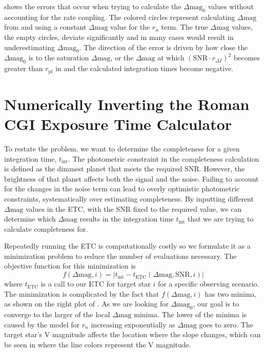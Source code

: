  shows the errors that occur when trying to
calculate the $\Delta\textrm{mag}_0$ values without accounting for the rate
coupling. The colored circles represent calculating $\Delta\textrm{mag}$
from  and using a constant
$\Delta\textrm{mag}$ value for the $r_n$ term. The true $\Delta\textrm{mag}$
values, the empty circles, deviate significantly and in many cases would result
in underestimating $\Delta\textrm{mag}_0$. The direction of the error is driven
by how close the $\Delta\textrm{mag}_0$ is to the saturation
$\Delta\textrm{mag}$, or the $\Delta\textrm{mag}$ at which $\left(\textrm{SNR}
\cdot r_{\Delta I}\right)^2$ becomes greater than $r_{\textrm{pl}}$ in
 and the calculated integration times become
negative.



\section{Numerically Inverting the Roman CGI Exposure Time Calculator}
\label{sec:numerically_inverting_ETC}

To restate the problem, we want to determine the completeness for a given
integration time, $t_{\textrm{int}}$. The photometric constraint in the
completeness calculation is defined as the dimmest planet that meets the
required SNR. However, the brightness of that planet affects both the signal
and the noise. Failing to account for the changes in the noise term can lead to
overly optimistic photometric constraints, systematically over estimating
completeness. By inputting different $\Delta\textrm{mag}$ values in the
ETC, with the SNR fixed to the required value, we can
determine which $\Delta\textrm{mag}$ results in the integration time
$t_{\textrm{int}}$ that we are trying to calculate completeness for.

Repeatedly running the ETC is computationally costly so we formulate it as a
minimization problem to reduce the number of evaluations necessary. The
objective function for this minimization is
\begin{equation}
  f(\Delta\textrm{mag}, i) = |t_{\textrm{int}} -
  t_{\textrm{ETC}}(\Delta\textrm{mag}, \textrm{SNR}, i)|
  \label{eq:intTime_root_obj}
\end{equation}
where $t_{\textrm{ETC}}$ is a call to our ETC for target star $i$ for a
specific observing scenario. The minimization is complicated by the fact that
$f\left(\Delta\textrm{mag}, i\right)$ has two minima, as shown on the right plot of
. As we are looking for
$\Delta\textrm{mag}_0$, our goal is to converge to the larger of the local
$\Delta\textrm{mag}$ minima. The lower of the minima is caused by the model for
$r_n$ increasing exponentially as $\Delta\textrm{mag}$ goes to zero. The target
star's V magnitude affects the location where the slope changes, which can be
seen in  where the line colors represent the V
magnitude.

